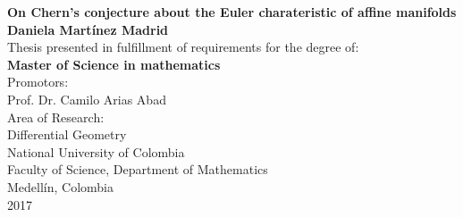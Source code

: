 \begin{tcolorbox}[colback=Mahogany,arc=0pt,outer arc=0pt,colframe=white,boxrule=0.0pt,halign upper=right, height=0.2cm,]
 \end{tcolorbox}

\restoregeometry


\newpage{\pagestyle{empty}\cleardoublepage}

\newpage
\begin{center}
	\thispagestyle{empty} \vspace*{0cm} \textbf{\huge
		On Chern's conjecture about the Euler charateristic of affine manifolds}\\[3.0cm]
	\Large\textbf{Daniela Mart\'{i}nez Madrid}\\[3.0cm]
	\small Thesis presented in fulfillment of requirements for the degree of:\\
	\textbf{Master of Science in mathematics}\\[2.5cm]
	Promotors:\\
	Prof. Dr. Camilo Arias Abad\\[2.0cm]
	Area of Research:\\
	Differential Geometry\\
	National University of Colombia\\
	Faculty of Science, Department of Mathematics\\
	Medell\'{i}n, Colombia\\
	2017\\
\end{center}